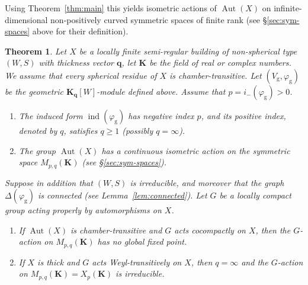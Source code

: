 \documentclass[12pt,a4paper]{amsproc}
\newtheorem{theorem}{Theorem}[section]
\theoremstyle{definition}
\DeclareMathOperator{\Aut}{Aut}
\DeclareMathOperator{\Ind}{ind}
\newcommand{\KK}{\mathbf K}
\newcommand{\qq}{\mathbf q}
\newcommand{\rg}{\mathrm g}
\begin{document}
Using Theorem~\ref{thm:main} this yields isometric actions of $\Aut(X)$ on  infinite-dimensional non-positively curved symmetric spaces of finite rank (see \S\ref{sec:sym-spaces} above for their definition).  


\begin{theorem}\label{thm:action-sym-space}
Let $X$ be a locally finite semi-regular building of non-spherical type $(W, S)$ with thickness vector $\qq$, let $\KK$ be the field of real or complex numbers. We assume that every spherical residue of $X$ is chamber-transitive. 
Let $(V_\rg, \varphi_\rg)$ be the geometric $\KK_\qq[W]$-module defined above. Assume that $p = i_-(\varphi_\rg)>0$. 

\begin{enumerate}[label=(\roman*)]
\item The induced form $\Ind(\varphi_\rg)$ has negative index $p$, and its positive index, denoted by $q$, satisfies $q \geq 1$ (possibly $q = \infty$). 

\item The group $\Aut(X)$ has a continuous isometric action on the symmetric space $M_{p, q}(\KK)$ (see \S\ref{sec:sym-spaces}).
\end{enumerate}
Suppose in addition that $(W, S)$ is irreducible,  and moreover that  the graph $\Delta(\varphi_\rg)$ is connected (see Lemma~\ref{lem:connected}). Let $G$ be a locally compact group acting properly by automorphisms on $X$. 
\begin{enumerate}[resume*]
\item If $\Aut(X)$ is chamber-transitive and $G$ acts cocompactly on $X$,   then the $G$-action on $M_{p, q}(\KK)$ has no global fixed point. 

\item If $X$ is thick and $G$ acts Weyl-transitively on $X$, then $q = \infty$ and the $G$-action on $M_{p, q}(\KK) = X_p(\KK)$ is irreducible. 
\end{enumerate}
	
\end{theorem}
\end{document}

